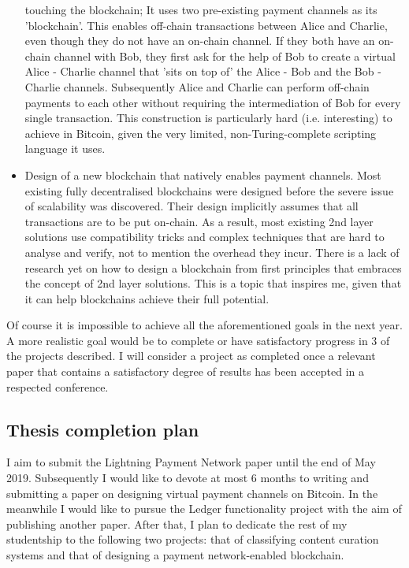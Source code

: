 \begin{itemize}
      touching the blockchain; It uses two pre-existing payment channels as its
      'blockchain'. This enables off-chain transactions between Alice and
      Charlie, even though they do not have an on-chain channel. If they both
      have an on-chain channel with Bob, they first ask for the help of Bob to
      create a virtual Alice - Charlie channel that 'sits on top of' the Alice -
      Bob and the Bob - Charlie channels. Subsequently Alice and Charlie can
      perform off-chain payments to each other without requiring the
      intermediation of Bob for every single transaction. This construction is
      particularly hard (i.e. interesting) to achieve in Bitcoin, given the very
      limited, non-Turing-complete scripting language it uses.
      \item Design of a new blockchain that natively enables payment channels.
      Most existing fully decentralised blockchains were designed before the
      severe issue of scalability was discovered. Their design implicitly
      assumes that all transactions are to be put on-chain. As a result, most
      existing 2nd layer solutions use compatibility tricks and complex
      techniques that are hard to analyse and verify, not to mention the
      overhead they incur. There is a lack of research yet on how to design a
      blockchain from first principles that embraces the concept of 2nd layer
      solutions. This is a topic that inspires me, given that it can help
      blockchains achieve their full potential.
    \end{itemize}

    Of course it is impossible to achieve all the aforementioned goals in the
    next year. A more realistic goal would be to complete or have satisfactory
    progress in 3 of the projects described. I will consider a project as
    completed once a relevant paper that contains a satisfactory degree of
    results has been accepted in a respected conference.

  \subsection{Thesis completion plan}
    I aim to submit the Lightning Payment Network paper until the end of May
    2019. Subsequently I would like to devote at most 6 months to writing and
    submitting a paper on designing virtual payment channels on Bitcoin. In the
    meanwhile I would like to pursue the Ledger functionality project with the
    aim of publishing another paper. After that, I plan to dedicate the rest of
    my studentship to the following two projects: that of classifying content
    curation systems and that of designing a payment network-enabled blockchain.

